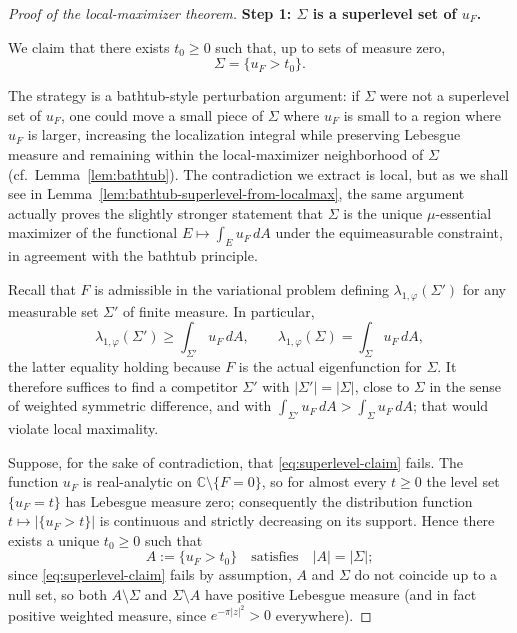 \documentclass[a4paper,11pt,reqno]{amsart}
\numberwithin{equation}{section}
\theoremstyle{plain} %
\theoremstyle{definition} %
\theoremstyle{remark}
\newcommand{\C}{\mathbb{C}}
\begin{document}
\begin{proof}[Proof of the local-maximizer theorem]
\medskip
\noindent
{\bf Step 1: \(\Sigma\) is a superlevel set of \(u_F\).}

We claim that there exists \(t_0\ge 0\) such that, up to sets of measure zero,
\begin{equation}\label{eq:superlevel-claim}
\Sigma=\{u_F>t_0\}.
\end{equation}

The strategy is a bathtub-style perturbation argument: if \(\Sigma\) were not a
superlevel set of \(u_F\), one could move a small piece of \(\Sigma\) where
\(u_F\) is small to a region where \(u_F\) is larger, increasing the
localization integral while preserving Lebesgue measure and remaining within
the local-maximizer neighborhood of \(\Sigma\) (cf.\ Lemma~\ref{lem:bathtub}).
The contradiction we extract is local, but as we shall see in
Lemma~\ref{lem:bathtub-superlevel-from-localmax}, the same argument actually
proves the slightly stronger statement that \(\Sigma\) is the unique
\(\mu\)-essential maximizer of the functional \(E\mapsto \int_E u_F\,dA\)
under the equimeasurable constraint, in agreement with the bathtub principle.

Recall that \(F\) is admissible in the variational problem defining
\(\lambda_{1,\varphi}(\Sigma')\) for any measurable set \(\Sigma'\) of finite
measure. In particular,
\[
\lambda_{1,\varphi}(\Sigma')\ge \int_{\Sigma'} u_F\,dA,
\qquad
\lambda_{1,\varphi}(\Sigma)= \int_\Sigma u_F\,dA,
\]
the latter equality holding because \(F\) is the actual eigenfunction for
\(\Sigma\). It therefore suffices to find a competitor \(\Sigma'\) with
\(|\Sigma'|=|\Sigma|\), close to \(\Sigma\) in the sense of weighted symmetric
difference, and with \(\int_{\Sigma'} u_F\,dA>\int_\Sigma u_F\,dA\); that would
violate local maximality.

Suppose, for the sake of contradiction, that \eqref{eq:superlevel-claim} fails.
The function \(u_F\) is real-analytic on \(\C\setminus\{F=0\}\), so for almost
every \(t\ge 0\) the level set \(\{u_F=t\}\) has Lebesgue measure zero;
consequently the distribution function \(t\mapsto |\{u_F>t\}|\) is continuous
and strictly decreasing on its support. Hence there exists a unique
\(t_0\ge 0\) such that
\[
A:=\{u_F>t_0\}\quad\text{satisfies}\quad |A|=|\Sigma|;
\]
since \eqref{eq:superlevel-claim} fails by assumption, \(A\) and \(\Sigma\)
do not coincide up to a null set, so both \(A\setminus\Sigma\) and
\(\Sigma\setminus A\) have positive Lebesgue measure (and in fact positive
weighted measure, since \(e^{-\pi|z|^2}>0\) everywhere).


\end{proof}
\end{document}
